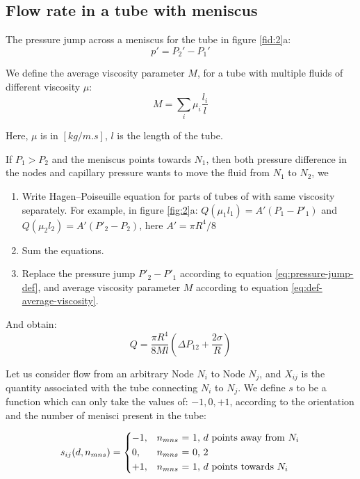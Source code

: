 \documentclass[
	12pt
] {article}
\begin{document}
\subsection{Flow rate in a tube with meniscus}
	The pressure jump across a meniscus for the tube in figure \ref{fid:2}a:
	\begin{equation} \label{eq:pressure-jump-def} 
		 p' = P_{2}' - P_{1}'
	\end{equation}
	
	We define the average viscosity parameter $M$, for a tube with multiple fluids of different viscosity $\mu$:
	\begin{equation} \label{eq:def-average-viscosity}
		M = \sum_{i} \mu_{i} \frac{l_{i}}{l}
	\end{equation}
	
	Here, $\mu$ is in $[kg/m.s]$, $l$ is the length of the tube.
	
	If $P_1 > P_2$ and the meniscus points towards $N_1$, then both pressure difference in the nodes and capillary pressure wants to move the fluid from $N_1$ to $N_2$, we
	\begin{enumerate}
		\item Write Hagen–Poiseuille equation \cite{sutera1993history} for parts of tubes of with same viscosity separately. For example, in figure \ref{fig:2}a: $Q(\mu_1 l_1) = A' (P_1 - P'_1)$ and $Q(\mu_2 l_2) = A' (P'_2 - P_2)$, here $A' = \pi R^4 / 8$
		\item Sum the equations.
		\item Replace the pressure jump $P'_2 - P'_1$ according to equation \ref{eq:pressure-jump-def}, and average viscosity parameter $M$ according to equation \ref{eq:def-average-viscosity}.
	\end{enumerate}
	And obtain:
	\begin{equation} \label{eq:flow-rate-main}
		Q = \frac{\pi R^4}{8Ml} \left( \Delta P_{12} + \frac{2 \sigma}{R} \right)
	\end{equation}
	
	Let us consider flow from an arbitrary Node $N_i$ to Node $N_j$, and $X_{ij}$ is the quantity associated with the tube connecting $N_i$ to $N_j$. We define $s$ to be a function which can only take the values of: $-1, 0, +1$, according to the orientation and the number of menisci present in the tube:
	
	\begin{equation}
		s_{ij}(d, n_{mns}) = 
		\begin{dcases}
			-1,&\text{$n_{mns}$ = 1, $d$ points away from $N_{i}$}\\
			0,&\text{$n_{mns}$ = 0, 2}\\
			+1,&\text{$n_{mns}$ = 1, $d$ points towards $N_{i}$}
		\end{dcases}
	\end{equation}
\end{document}
